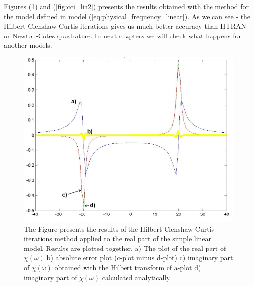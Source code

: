 \documentclass[12pt,twoside,a4paper]{article}
\numberwithin{equation}{subsection}
\numberwithin{figure}{subsection}
\begin{document}
Figures (\ref{fig:cci_lin1}) and (\ref{fig:cci_lin2}) presents the results obtained with the method for the model defined in
model (\ref{eq:physical_frequency_linear}). As we can see - the Hilbert Clenshaw-Curtis iterations gives us much better accuracy than HTRAN
or Newton-Cotes quadrature. In next chapters we will check what happens for another models.

\begin{figure} 
  \includegraphics[width=150mm]{img/hcc_lin1.png}
  \caption{The Figure presents the results of the Hilbert Clenshaw-Curtis iterations method applied to the real part of the simple linear
  model. Results are plotted together.
   a) The plot of the real part of $\chi (\omega )$ 
   b) absolute error plot (c-plot minus d-plot) 
   c) imaginary part of $\chi (\omega )$ obtained with the Hilbert transform of a-plot 
   d) imaginary part of $\chi (\omega )$  calculated analytically. \label{fig:cci_lin1}
  }
\end{figure}
\end{document}
